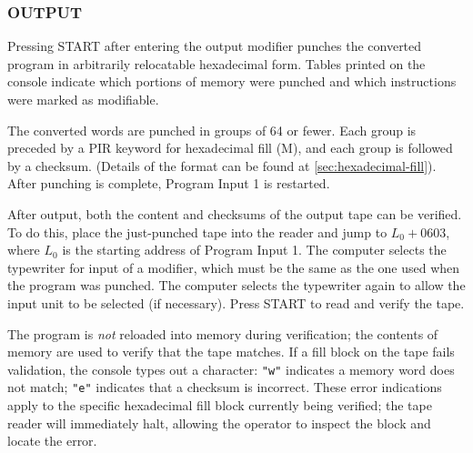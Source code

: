 \subsubsection*{OUTPUT}
Pressing \textsf{START} after entering the output modifier punches the converted program in arbitrarily relocatable hexadecimal form. Tables printed on the console indicate which portions of memory were punched and which instructions were marked as modifiable.

The converted words are punched in groups of 64 or fewer. Each group is preceded by a PIR keyword for hexadecimal fill (M), and each group is followed by a checksum. (Details of the format can be found at \ref{sec:hexadecimal-fill}). After punching is complete, Program Input 1 is restarted.

After output, both the content and checksums of the output tape can be verified. To do this, place the just-punched tape into the reader and jump to $L_0+0603$, where $L_0$ is the starting address of Program Input 1. The computer selects the typewriter for input of a modifier, which must be the same as the one used when the program was punched. The computer selects the typewriter again to allow the input unit to be selected (if necessary). Press \textsf{START} to read and verify the tape.

The program is \emph{not} reloaded into memory during verification; the contents of memory are used to verify that the tape matches. If a fill block on the tape fails validation, the console types out a character: \texttt{"w"} indicates a memory word does not match; \texttt{"e"} indicates that a checksum is incorrect. These error indications apply to the specific hexadecimal fill block currently being verified; the tape reader will immediately halt, allowing the operator to inspect the block and locate the error.
